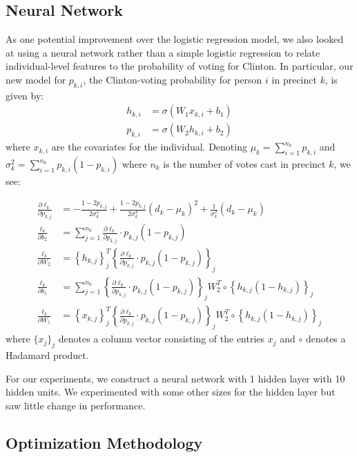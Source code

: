 \documentclass[10pt,twocolumn,letterpaper]{article}
\begin{document}
\subsection{Neural Network} 
As one potential improvement over the logistic regression model, we also looked at using a neural network rather than a simple logistic regression to relate individual-level features to the probability of voting for Clinton. In particular, our new model for $p_{k, i}$, the Clinton-voting probability for person $i$ in precinct $k$, is given by: 
\begin{align*}
h_{k, i} &= \sigma\left(W_1 x_{k, i} + b_1 \right) \\
p_{k, i} &= \sigma\left(W_2 h_{k, i} + b_2 \right) 
\end{align*}
where $x_{k, i}$ are the covariates for the individual. Denoting $\mu_k = \sum_{i = 1}^{n_k} p_{k, i}$ and $\sigma_k^2 = \sum_{i = 1}^{n_k} p_{k, i} (1 - p_{k, i})$ where $n_k$ is the number of votes cast in precinct $k$, we see: 

\begin{align*}
\frac{\partial \ell_k}{\partial p_{k, j}} &= - \frac{1 - 2p_{k, j}}{2 \sigma_k^2} + \frac{1 - 2p_{k, j}}{2 \sigma_k^4} (d_k - \mu_k)^2  + \frac{1}{\sigma_k^2} \left(d_k - \mu_k \right) \\
\frac{\ell_k}{\partial b_2} &= \sum_{j = 1}^{n_k} \frac{\partial \ell_k}{\partial p_{k, j}} \cdot p_{k, j} (1 - p_{k, j}) \\
\frac{\ell_k}{\partial W_2} &= \left\{ h_{k, j} \right\}_j^T \left\{ \frac{\partial \ell_k}{\partial p_{k, j}} \cdot p_{k, j} (1 - p_{k, j})\right\}_{j} \\
\frac{\ell_k}{\partial b_1} &= \sum_{j = 1}^{n_k} \left\{ \frac{\partial \ell_k}{\partial p_{k, j}} \cdot p_{k, j} (1 - p_{k, j})\right\}_{j} W_2^T \circ \left\{ h_{k, j}(1 - h_{k, j})\right\}_j \\
\frac{\ell_k}{\partial W_1} &= \left\{ x_{k, j} \right\}_j^T \left\{ \frac{\partial \ell_k}{\partial p_{k, j}} \cdot p_{k, j} (1 - p_{k, j})\right\}_{j} W_2^T \circ \left\{ h_{k, j}(1 - h_{k, j})\right\}_j
\end{align*}
where $\{x_j\}_j$ denotes a column vector consisting of the entries $x_j$ and $\circ$ denotes a Hadamard product.

For our experiments, we construct a neural network with 1 hidden layer with 10 hidden units. We experimented with some other sizes for the hidden layer but saw little change in performance.

\subsection{Optimization Methodology}
\end{document}
